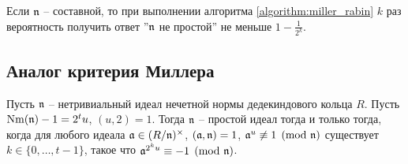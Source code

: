 \documentclass[_00_dissertation.tex]{subfiles}
\begin{document}
\begin{remark}
    Если $\mathfrak{n}$ -- составной, то при выполнении алгоритма \ref{algorithm:miller_rabin} $k$ раз вероятность получить ответ ''$\mathfrak{n}$ не простой'' не меньше $1 - \frac{1}{2^k}$.
\end{remark}

\subsection{Аналог критерия Миллера}

\begin{theorem}\label{theorem:miller_criteria}
    Пусть $\mathfrak{n}$ -- нетривиальный идеал нечетной нормы дедекиндового кольца $R$.
    Пусть $\textrm{Nm}(\mathfrak{n}) - 1 = 2^t u$, $(u, 2) = 1$.
    Тогда $\mathfrak{n}$ -- простой идеал тогда и только тогда, когда для любого идеала $\mathfrak{a} \in (R/\mathfrak{n})^{\times}$, $(\mathfrak{a}, \mathfrak{n}) = 1$, $\mathfrak{a}^u \not\equiv 1 \pmod{\mathfrak{n}}$ существует $k\in \{0, \dots, t-1\}$, такое что $\mathfrak{a}^{2^{k}u} \equiv -1 \pmod{\mathfrak{n}}$.
\end{theorem}
\end{document}

